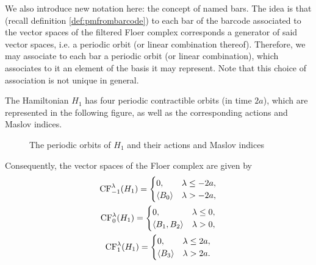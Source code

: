 We also introduce new notation here: the concept of named bars. The idea is that (recall definition \ref{def:pmfrombarcode}) to each bar of the barcode associated to the vector spaces of the filtered Floer complex corresponds a generator of said vector spaces, i.e. a periodic orbit (or linear combination thereof). Therefore, we may associate to each bar a periodic orbit (or linear combination), which associates to it an element of the basis it may represent. Note that this choice of association is not unique in general.
\begin{prop}
The Hamiltonian $H_1$ has four periodic contractible orbits (in time $2a$), which are represented in the following figure, as well as the corresponding actions and Maslov indices.
\begin{figure}[H]
\centering
{}
\caption{The periodic orbits of $H_1$ and their actions and Maslov indices}
\label{orbitsh1}
\end{figure}

Consequently, the vector spaces of the Floer complex are given by
\begin{equation}
\begin{gathered}
\mathrm{CF}_{-1}^\lambda(H_1) = \begin{cases}
0, & \lambda \leq -2a,\\
\langle B_0\rangle & \lambda > -2a,
\end{cases}
\\
\mathrm{CF}_{0}^\lambda(H_1) = \begin{cases}
0, & \lambda \leq 0,\\
\langle B_1,B_2\rangle & \lambda > 0,
\end{cases}
\\
\mathrm{CF}_{1}^\lambda(H_1) = \begin{cases}
0, & \lambda \leq 2a,\\
\langle B_3\rangle & \lambda  > 2a.
\end{cases}
\end{gathered}
\end{equation}


\end{prop}

